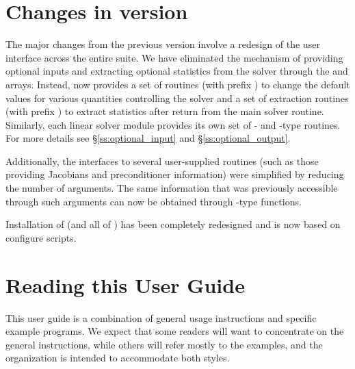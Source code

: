 \section{Changes in version {\idarelease}}
The major changes from the previous version involve a redesign of the
user interface across the entire {\sundials} suite. We have eliminated the
mechanism of providing optional inputs and extracting optional statistics 
from the solver through the  and  arrays. Instead,
{\ida} now provides a set of routines (with prefix )
to change the default values for various quantities controlling the
solver and a set of extraction routines (with prefix )
to extract statistics after return from the main solver routine.
Similarly, each linear solver module provides its own set of {-}
and {-type} routines. For more details see \S\ref{ss:optional_input}
and \S\ref{ss:optional_output}.

Additionally, the interfaces to several user-supplied routines
(such as those providing Jacobians and preconditioner information) 
were simplified by reducing the number
of arguments. The same information that was previously accessible
through such arguments can now be obtained through {-type}
functions.

Installation of {\ida} (and all of {\sundials}) has been completely 
redesigned and is now based on configure scripts.

\section{Reading this User Guide}\label{ss:reading}

This user guide is a combination of general usage instructions and
specific example programs.  We expect that some readers will want to
concentrate on the general instructions, while others will refer
mostly to the examples, and the organization is intended to
accommodate both styles.

